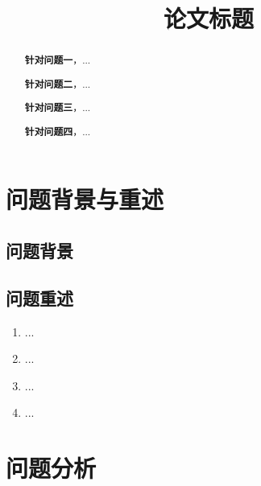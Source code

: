 \documentclass[15.75pt,a4paper]{ctexbook}
\title{论文标题}
\date{} %
\theoremstyle{definition}
\begin{document}
	\maketitle
	\vspace{-6em} %
	\begin{abstract}
		
		\textbf{针对问题一}，...
		
		\textbf{针对问题二}，...
		
		\textbf{针对问题三}，...
		
		\textbf{针对问题四}，...\\
		\newline
	\end{abstract}
	
	\clearpage %
	
	\section{问题背景与重述}
	\subsection{问题背景}
 
	
	\subsection{问题重述}
	\begin{enumerate}[itemindent=0.5cm]
		\item ...
		\item ...
		\item ...
		\item ...
	\end{enumerate}
	
	\section{问题分析}
\end{document}

